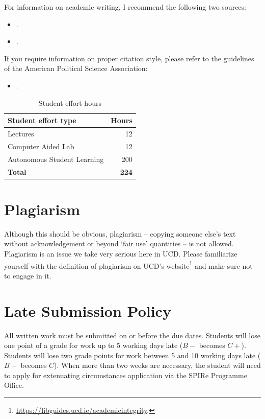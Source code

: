 \documentclass[abstract=on,parskip=full,headings=standardclasses,fontsize=11pt,paper=a4]{scrartcl}
\begin{document}
For information on academic writing, I recommend the following two sources:
\begin{itemize}
\item {}.
\item {}.
\end{itemize}

If you require information on proper citation style, please refer to the guidelines of the American Political Science Association:

\begin{itemize}
\item {}.
\end{itemize}



\begin{table}[h] \centering \onehalfspacing \footnotesize
\caption{Student effort hours}
\begin{tabular}{ l r} 
\toprule
Student effort type &  Hours \\
\midrule
Lectures & 12 \\
Computer Aided Lab  & 12 \\
Autonomous Student Learning  & 200 \\
\textbf{Total} & \textbf{224} \\
\bottomrule
\end{tabular}
\end{table}


\section*{Plagiarism}

Although this should be obvious, plagiarism -- copying someone else's text without acknowledgement or beyond `fair use' quantities -- is not allowed. Plagiarism is an issue we take very serious here in UCD. Please familiarize yourself with the definition of plagiarism on UCD's website\footnote{\url{https://libguides.ucd.ie/academicintegrity}.} and make sure not to engage in it.



\section*{Late Submission Policy}

All written work must be submitted on or before the due dates. Students will lose one point of a grade for work up to 5 working days late ($B-$ becomes $C+$). Students will lose two grade points for work between 5 and 10 working days late ($B-$ becomes $C$). When more than two weeks are necessary, the student will need to apply for extenuating circumstances application via the SPIRe Programme Office.
\end{document}
